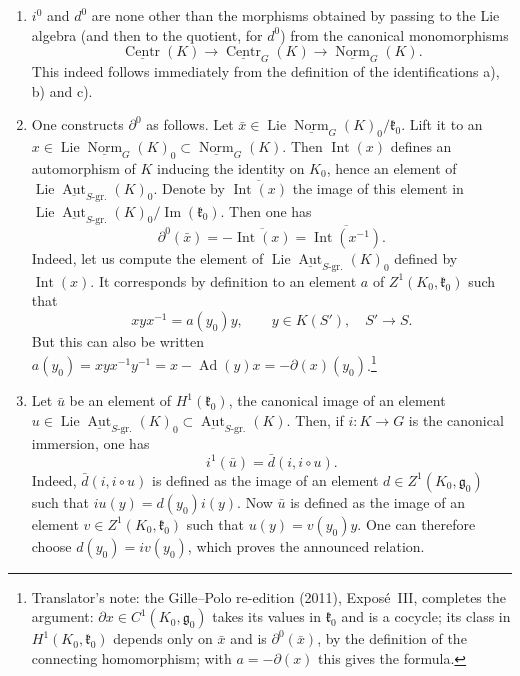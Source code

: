 \begin{enumerate}
\item[1)]
\(i^0\) and \(d^0\) are none other than the morphisms obtained by passing
to the Lie algebra (and then to the quotient, for \(d^0\)) from the
canonical monomorphisms
\[
 \underline{\operatorname{Centr}}(K)
 \longrightarrow
 \underline{\operatorname{Centr}}_G(K)
 \longrightarrow
 \underline{\operatorname{Norm}}_G(K).
\]
This indeed follows immediately from the definition of the
identifications a), b) and c).

\item[2)]
One constructs \(\partial^0\) as follows. Let
\(\bar x\in\operatorname{Lie}\underline{\operatorname{Norm}}_G(K)_0
/\mathfrak k_0\). Lift it to an
\(x\in\operatorname{Lie}\underline{\operatorname{Norm}}_G(K)_0
\subset\underline{\operatorname{Norm}}_G(K)\). Then
\(\operatorname{Int}(x)\) defines an automorphism of \(K\) inducing the
identity on \(K_0\), hence an element of
\(\operatorname{Lie}\underline{\operatorname{Aut}}_{S\text{-gr.}}(K)_0\).
Denote by \(\overline{\operatorname{Int}(x)}\) the image of this element in
\(\operatorname{Lie}\underline{\operatorname{Aut}}_{S\text{-gr.}}(K)_0
/\operatorname{Im}(\mathfrak k_0)\). Then one has
\[
 \partial^0(\bar x)
 =-\overline{\operatorname{Int}(x)}
 =\overline{\operatorname{Int}(x^{-1})}.
\]
Indeed, let us compute the element of
\(\operatorname{Lie}\underline{\operatorname{Aut}}_{S\text{-gr.}}(K)_0\)
defined by \(\operatorname{Int}(x)\). It corresponds by definition to an
element \(a\) of \(Z^1(K_0,\mathfrak k_0)\) such that
\[
 xyx^{-1}=a(y_0)y,
 \qquad y\in K(S'),\quad S'\longrightarrow S.
\]
But this can also be written
\(a(y_0)=xyx^{-1}y^{-1}=x-\operatorname{Ad}(y)x=-\partial(x)(y_0)\).\footnote{Translator's note: the Gille--Polo re-edition (2011), Exposé~III, completes the
argument: \(\partial x\in C^1(K_0,\mathfrak g_0)\) takes its values in
\(\mathfrak k_0\) and is a cocycle; its class in \(H^1(K_0,\mathfrak k_0)\)
depends only on \(\bar x\) and is \(\partial^0(\bar x)\), by the definition
of the connecting homomorphism; with \(a=-\partial(x)\) this gives the
formula.}

\item[3)]
Let \(\bar u\) be an element of \(H^1(\mathfrak k_0)\), the canonical
image of an element
\(u\in\operatorname{Lie}\underline{\operatorname{Aut}}_{S\text{-gr.}}(K)_0
\subset\underline{\operatorname{Aut}}_{S\text{-gr.}}(K)\).
Then, if \(i:K\to G\) is the canonical immersion, one has
\[
 i^1(\bar u)=\bar d(i,i\circ u).
\]
Indeed, \(\bar d(i,i\circ u)\) is defined as the image of an element
\(d\in Z^1(K_0,\mathfrak g_0)\) such that \(iu(y)=d(y_0)i(y)\). Now
\(\bar u\) is defined as the image of an element
\(v\in Z^1(K_0,\mathfrak k_0)\) such that \(u(y)=v(y_0)y\). One can
therefore choose \(d(y_0)=iv(y_0)\), which proves the announced relation.


\end{enumerate}
